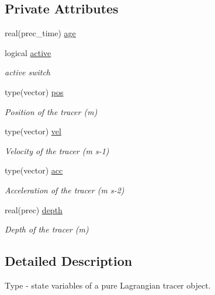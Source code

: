 \subsection*{Private Attributes}
\begin{DoxyCompactItemize}
\item 
real(prec\+\_\+time) \mbox{\hyperlink{structtracer__base__mod_1_1tracer__state__class_a626e0afcfae26bbab40a6ed5e4e6d67b}{age}}
\item 
logical \mbox{\hyperlink{structtracer__base__mod_1_1tracer__state__class_ab32056ce018eb780a7af79f1598db58d}{active}}
\begin{DoxyCompactList}\small\item\em active switch \end{DoxyCompactList}\item 
type(vector) \mbox{\hyperlink{structtracer__base__mod_1_1tracer__state__class_a1b258c263cb63d6f03f08b6d969f94d7}{pos}}
\begin{DoxyCompactList}\small\item\em Position of the tracer (m) \end{DoxyCompactList}\item 
type(vector) \mbox{\hyperlink{structtracer__base__mod_1_1tracer__state__class_a3ea133d907fd662b8be1bdb540e2929d}{vel}}
\begin{DoxyCompactList}\small\item\em Velocity of the tracer (m s-\/1) \end{DoxyCompactList}\item 
type(vector) \mbox{\hyperlink{structtracer__base__mod_1_1tracer__state__class_adb9c1ee8cf97beb75d338ea0911c7fbb}{acc}}
\begin{DoxyCompactList}\small\item\em Acceleration of the tracer (m s-\/2) \end{DoxyCompactList}\item 
real(prec) \mbox{\hyperlink{structtracer__base__mod_1_1tracer__state__class_a4ccd21ef0bc2b596686276d2a44f2ee0}{depth}}
\begin{DoxyCompactList}\small\item\em Depth of the tracer (m) \end{DoxyCompactList}\end{DoxyCompactItemize}


\subsection{Detailed Description}
Type -\/ state variables of a pure Lagrangian tracer object. 

